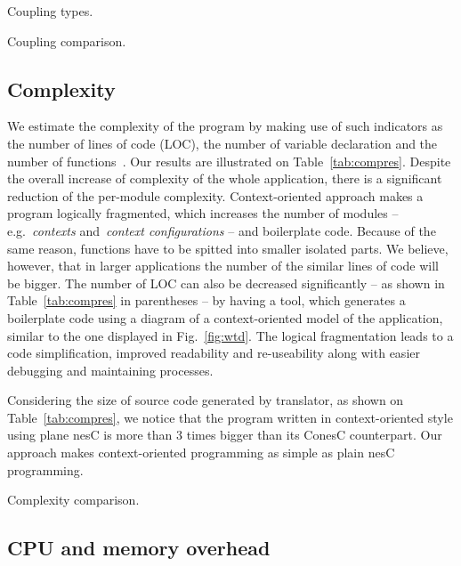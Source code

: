 \begin{table}[!h]
\renewcommand{\arraystretch}{1.3}
\caption{Coupling types.}
\label{tab:couptypes}

\end{table}

\begin{table}[!h]
\renewcommand{\arraystretch}{1.3}
\caption{Coupling comparison.}
\label{tab:coupres}

\end{table}

\subsection{Complexity} 

We estimate the complexity of the program by making use of such indicators as the number of
lines of code (LOC), the number of variable declaration and the number of
functions~\cite{pressman01}. Our results are illustrated on
Table~\ref{tab:compres}. Despite the overall increase of complexity of the whole
application, there is a significant reduction of the per-module complexity.
Context-oriented approach makes a program logically
fragmented, which increases the number of modules -- e.g.~\emph{contexts}
and~\emph{context configurations} -- and boilerplate code. Because of the same
reason, functions have to be spitted into smaller isolated parts. We believe, however,
that in larger applications the number of the similar lines of code will be bigger.
The number of LOC can also be decreased significantly -- as shown in Table~\ref{tab:compres} in
parentheses -- by having a tool, which generates a boilerplate code using a diagram of a
context-oriented model of the application, similar to the one displayed in
Fig.~\ref{fig:wtd}. The logical fragmentation leads to a code simplification,
improved readability and re-useability along with easier debugging and maintaining processes.

Considering the size of source code generated by translator, as shown on
Table~\ref{tab:compres}, we notice that the program written in context-oriented
style using plane nesC  is more than 3 times bigger than its ConesC counterpart. Our
approach makes context-oriented programming as simple as plain nesC programming.

\begin{table}[!h]
\renewcommand{\arraystretch}{1.3}
\caption{Complexity comparison.}
\label{tab:compres}

\end{table}

\subsection{CPU and memory overhead}

